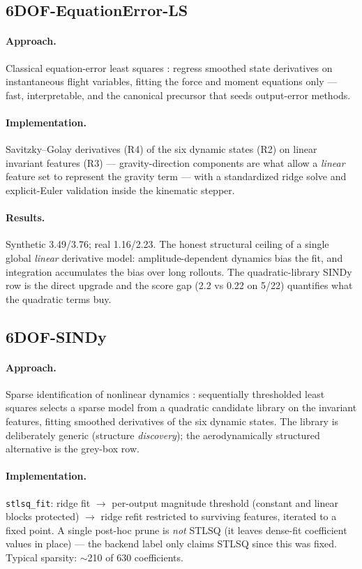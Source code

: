 \documentclass[11pt]{article}
\begin{document}
\subsection{6DOF-EquationError-LS}
\paragraph{Approach.} Classical equation-error least squares
\cite{KleinMorelli2006,morelli_system_2002}: regress smoothed state
derivatives on instantaneous flight variables, fitting the force and moment
equations only --- fast, interpretable, and the canonical precursor that
seeds output-error methods.
\paragraph{Implementation.} Savitzky--Golay derivatives (R4) of the six
dynamic states (R2) on linear invariant features (R3) --- gravity-direction
components are what allow a \emph{linear} feature set to represent the
gravity term --- with a standardized ridge solve and explicit-Euler
validation inside the kinematic stepper.
\paragraph{Results.} Synthetic 3.49/3.76; real 1.16/2.23. The honest
structural ceiling of a single global \emph{linear} derivative model:
amplitude-dependent dynamics bias the fit, and integration accumulates the
bias over long rollouts. The quadratic-library SINDy row is the direct
upgrade and the score gap (2.2 vs 0.22 on 5/22) quantifies what the
quadratic terms buy.

\subsection{6DOF-SINDy}
\paragraph{Approach.} Sparse identification of nonlinear dynamics
\cite{brunton2016discovering,champion2019data}: sequentially thresholded
least squares selects a sparse model from a quadratic candidate library on
the invariant features, fitting smoothed derivatives of the six dynamic
states. The library is deliberately generic (structure \emph{discovery});
the aerodynamically structured alternative is the grey-box row.
\paragraph{Implementation.} \texttt{stlsq\_fit}: ridge fit
$\rightarrow$ per-output magnitude threshold (constant and linear blocks
protected) $\rightarrow$ ridge refit restricted to surviving features,
iterated to a fixed point. A single post-hoc prune is \emph{not} STLSQ
(it leaves dense-fit coefficient values in place) --- the backend label only
claims STLSQ since this was fixed. Typical sparsity: $\sim$210 of 630
coefficients.
\end{document}
